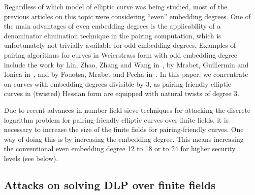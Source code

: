 Regardless of which model of elliptic curve was being studied,
most of the previous articles on this topic were considering ``even'' embedding degrees.
One of the main advantages of even embedding degrees is the applicability of a denominator elimination technique in the pairing computation,
which is unfortunately not trivially available for odd embedding degrees.
Examples of pairing algorithms for curves in Weierstrass form with odd embedding degree include
the work by Lin, Zhao, Zhang and Wang in~\cite{2008/lin}, by Mrabet, Guillermin and Ionica in~\cite{2009/deg15},
and by Fouotsa, Mrabet and Pecha in~\cite{2016/degodd}.
In this paper, we concentrate on curves with embedding degrees divisible by 3,
as pairing-friendly elliptic curves in (twisted) Hessian form are equipped with natural twists of degree 3.

Due to recent advances in number field sieve techniques for attacking the discrete logarithm problem for pairing-friendly elliptic curves over finite fields,
it is necessary to increase the size of the finite fields for pairing-friendly curves.
One way of doing this is by increasing the embedding degree.
This means increasing the conventional even embedding degree 12 to 18 or to 24 for higher security levels (see below).




\subsection{Attacks on solving DLP over finite fields}

